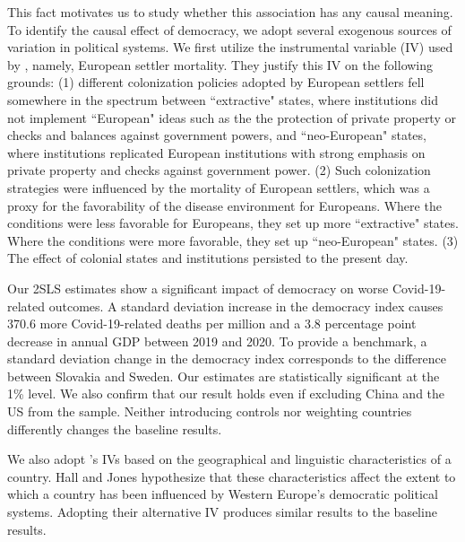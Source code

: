 This fact motivates us to study whether this association has any causal meaning. To identify the causal effect of democracy, we adopt several exogenous sources of variation in political systems. 
We first utilize the instrumental variable (IV) used by \textcite{ajr}, namely, European settler mortality. They justify  this IV on the following grounds: (1) different colonization policies adopted by European settlers fell somewhere in the spectrum between ``extractive" states, where institutions did not implement ``European" ideas such as the the protection of private property or checks and balances against government powers, and ``neo-European" states, where institutions replicated European institutions with strong emphasis on private property and checks against government power. (2) Such colonization strategies were influenced by the mortality of European settlers, which was a proxy for the favorability of the disease environment for Europeans. Where the conditions were less favorable for Europeans, they set up more ``extractive" states. Where the conditions were more favorable, they set up ``neo-European" states. (3) The effect of colonial states and institutions persisted to the present day. %


Our 2SLS estimates show a significant impact of democracy on worse Covid-19-related outcomes. 
A standard deviation increase in the democracy index causes 370.6 more Covid-19-related deaths per million and a 3.8 percentage point decrease in annual GDP between 2019 and 2020. To provide a benchmark, a standard deviation change in the democracy index corresponds to the difference between Slovakia and Sweden. Our estimates are statistically significant at the 1\% level. We also confirm that our result holds even if excluding China and the US from the sample. Neither introducing controls nor weighting countries differently changes the baseline results. 

We also adopt \textcite{hj}'s IVs based on the geographical and linguistic characteristics of a country. Hall and Jones hypothesize that these characteristics affect the extent to which a country has been influenced by Western Europe's democratic political systems. Adopting their alternative IV produces similar results to the baseline results. \\

